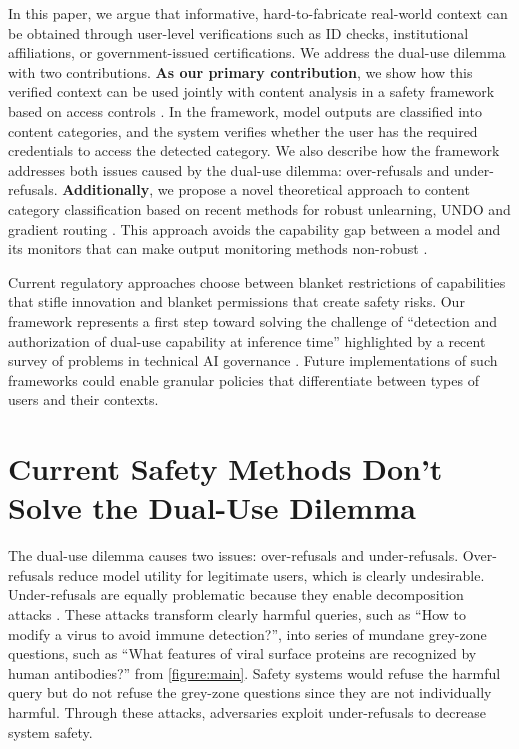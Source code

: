 \documentclass{article}
\theoremstyle{plain}
\theoremstyle{definition}
\theoremstyle{remark}
\begin{document}
In this paper, we argue that informative, hard-to-fabricate real-world context can be obtained through user-level verifications such as ID checks, institutional affiliations, or government-issued certifications.
We address the dual-use dilemma with two contributions.
\textbf{As our primary contribution}, we show how this verified context can be used jointly with content analysis in a safety framework based on access controls \cite{butler1974}.
In the framework, model outputs are classified into content categories, and the system verifies whether the user has the required credentials to access the detected category.
We also describe how the framework addresses both issues caused by the dual-use dilemma: over-refusals and under-refusals.
\textbf{Additionally}, we propose a novel theoretical approach to content category classification based on recent methods for robust unlearning, UNDO \cite{lee2025distillationrobustifiesunlearning} and gradient routing \cite{cloud2024gradientroutingmaskinggradients}.
This approach avoids the capability gap between a model and its monitors that can make output monitoring methods non-robust \cite{jin2024jailbreakinglargelanguagemodels}.

Current regulatory approaches choose between blanket restrictions of capabilities that stifle innovation and blanket permissions that create safety risks.
Our framework represents a first step toward solving the challenge of ``detection and authorization of dual-use capability at inference time'' highlighted by a recent survey of problems in technical AI governance \cite{reuel2025openproblemstechnicalai}.
Future implementations of such frameworks could enable granular policies that differentiate between types of users and their contexts.

\section{Current Safety Methods Don't Solve the Dual-Use Dilemma}
\label{section:current-methods}

The dual-use dilemma causes two issues: over-refusals and under-refusals.
Over-refusals reduce model utility for legitimate users, which is clearly undesirable.
Under-refusals are equally problematic because they enable decomposition attacks \cite{glukhov2023llmcensorshipmachinelearning, glukhov2024breachthousandleaksunsafe}.
These attacks transform clearly harmful queries, such as ``How to modify a virus to avoid immune detection?'', into series of mundane grey-zone questions, such as ``What features of viral surface proteins are recognized by human antibodies?'' from \cref{figure:main}.
Safety systems would refuse the harmful query but do not refuse the grey-zone questions since they are not individually harmful.
Through these attacks, adversaries exploit under-refusals to decrease system safety.
\end{document}
